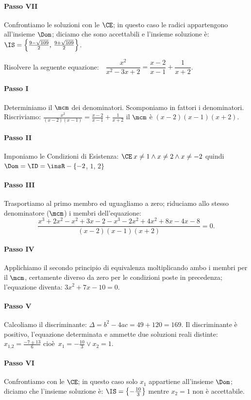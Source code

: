 \begin{exrig}
\begin{esempio}
 \paragraph{Passo VII} Confrontiamo le soluzioni con le $\CE$; in questo caso le radici appartengono all'insieme $\Dom$; diciamo che sono accettabili e l'insieme soluzione è: $\IS=\left\{\frac{9 - \sqrt{109}}{2}\text{, }\frac{9 +\sqrt{109}}{2} \right\}$.
 \end{esempio}

 \begin{esempio}
Risolvere la seguente equazione:~~$\dfrac{x^{2}}{x^{2} - 3 x + 2}=\dfrac{x - 2}{x - 1} +\dfrac{1}{x + 2}$.
 \paragraph{Passo I} Determiniamo il $\mcm$ dei denominatori. Scomponiamo in fattori i denominatori. Riscriviamo: $\frac{x^{2}}{( x - 2 ) ( x - 1 )}=\frac{x - 2}{x - 1} +\frac{1}{x + 2}$ il $\mcm$ è $( x - 2 ) ( x - 1 ) ( x + 2 )$.
 \paragraph{Passo II} Imponiamo le Condizioni di Esistenza: $\CE\: x \neq 1 \wedge x \neq 2 \wedge x \neq - 2$ quindi $\Dom = \ID =\insR - \{-2$, $1$, $2\}$
 \paragraph{Passo III} Trasportiamo al primo membro ed uguagliamo a zero; riduciamo allo stesso denominatore ($\mcm$) i membri dell'equazione: 
\[\frac{x^{3} + 2 x^{2} - x^{2} + 3 x - 2 - x^{3} - 2 x^{2} + 4x^{2} + 8 x - 4 x - 8}{( x - 2 ) ( x - 1 ) ( x + 2 )} = 0.\]
 \paragraph{Passo IV} Applichiamo il secondo principio di equivalenza moltiplicando ambo i membri per il $\mcm$, certamente diverso da zero per le condizioni poste in precedenza; l'equazione diventa: $3 x^{2} + 7 x - 10 = 0$.
 \paragraph{Passo V} Calcoliamo il discriminante: $\Delta=b^{2} - 4 a c=49 + 120=169$. Il discriminante è positivo, l'equazione determinata e ammette due soluzioni reali distinte: $x_{1\text{,}2}=\frac{- 7 \pm 13}{6}$ cioè~$x_{1}=-\frac{10}{3} \vee x_{2}=1$.
 \paragraph{Passo VI} Confrontiamo con le $\CE$; in questo caso solo $x_{1}$ appartiene all'insieme $\Dom$; diciamo che l'insieme soluzione è: $\IS=\left\{-\frac{10}{3}\right\}$ mentre $x_{2} = 1$ non è accettabile.
\end{esempio}
\end{exrig}
\vspazio\ovalbox{\risolvii \ref{ese:3.36}, \ref{ese:3.37}, \ref{ese:3.38}, \ref{ese:3.39}, \ref{ese:3.40}, \ref{ese:3.41}, \ref{ese:3.42}, \ref{ese:3.43}, \ref{ese:3.44}, \ref{ese:3.45}, \ref{ese:3.46}, \ref{ese:3.47},}

